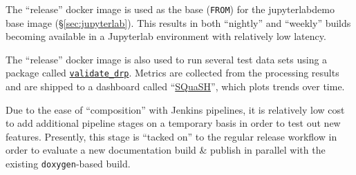 The ``release'' docker image is used as the base (\texttt{FROM}) for the
jupyterlabdemo base image (\S\ref{sec:jupyterlab}).  This results in both
``nightly'' and ``weekly'' builds becoming available in a Jupyterlab environment
with relatively low latency.

The ``release'' docker image is also used to run several test data sets using a
package called
\href{https://github.com/lsst/validate_drp/}{\texttt{validate\_drp}}.
Metrics are collected from the processing results and are shipped to a
dashboard called ``\href{https://squash.lsst.codes/}{SQuaSH}''\cite{SQR-009}, which plots
trends over time.

Due to the ease of ``composition'' with Jenkins pipelines, it is relatively low
cost to add additional pipeline stages on a temporary basis in order to test out
new features.  Presently, this stage is ``tacked on'' to the regular release
workflow in order to evaluate a new documentation build \& publish in parallel
with the existing \texttt{doxygen}-based build.
